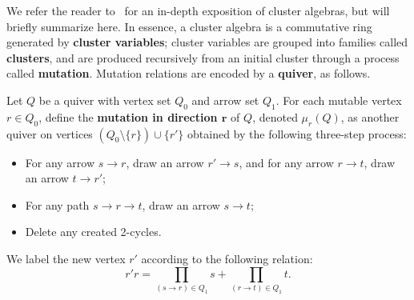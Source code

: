 We refer the reader to~\cite{fwz-ch1-3} for an in-depth exposition of cluster algebras, but will briefly summarize here. In essence, a cluster algebra is a commutative ring generated by \textbf{cluster variables}; cluster variables are grouped into families called \textbf{clusters}, and are produced recursively from an initial cluster through a process called \textbf{mutation}. Mutation relations are encoded by a \textbf{quiver}, as follows.
\begin{defi} \label{definition:mutation}
Let $Q$ be a quiver with vertex set $Q_0$ and arrow set $Q_1$. For each mutable vertex $r \in Q_0$, define the \textbf{mutation in direction $\mathbf{r}$} of $Q$, denoted $\mu_r(Q)$, as another quiver on vertices $(Q_0 \setminus \{r\}) \cup \{r'\}$ obtained by the following three-step process:

\begin{itemize}
    \item For any arrow $s \rightarrow r$, draw an arrow $r' \rightarrow s$, and for any arrow $r \rightarrow t$, draw an arrow $t \rightarrow r'$;
    \item For any path $s \to r\to t$, draw an arrow $s \to t$;
    \item Delete any created 2-cycles.
\end{itemize}

We label the new vertex $r'$ according to the following relation:
\[r' r = \prod_{(s \to r) \in Q_1} s + \prod_{(r \to t) \in Q_1} t.\]
\end{defi}
